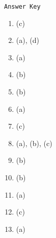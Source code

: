 \begin{center}
\texttt{Answer Key}
\begin{multicols}{5}
\begin{enumerate}
\item (c)
\item (a), (d)
\item (a)
\item (b)
\item (b)
\item (a)
\item (c)
\item (a), (b), (c)
\item (b)
\item (b)
\item (a)
\item (c)
\item (a)
\end{enumerate}
\end{multicols}
\end{center}
